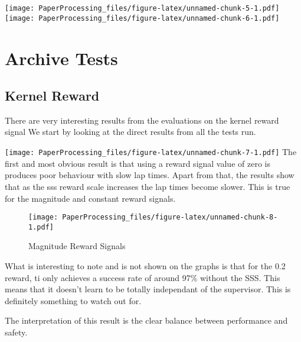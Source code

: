 \documentclass[
]{article}
\begin{document}
\texttt{[image: PaperProcessing\_files/figure-latex/unnamed-chunk-5-1.pdf]}
\texttt{[image: PaperProcessing\_files/figure-latex/unnamed-chunk-6-1.pdf]}

\hypertarget{archive-tests}{%
\section{Archive Tests}\label{archive-tests}}

\hypertarget{kernel-reward-1}{%
\subsection{Kernel Reward}\label{kernel-reward-1}}

There are very interesting results from the evaluations on the kernel
reward signal We start by looking at the direct results from all the
tests run.

\texttt{[image: PaperProcessing\_files/figure-latex/unnamed-chunk-7-1.pdf]}
The first and most obvious result is that using a reward signal value of
zero is produces poor behaviour with slow lap times. Apart from that,
the results show that as the sss reward scale increases the lap times
become slower. This is true for the magnitude and constant reward
signals.

\begin{figure}
\centering
\texttt{[image: PaperProcessing\_files/figure-latex/unnamed-chunk-8-1.pdf]}
\caption{Magnitude Reward Signals}
\end{figure}

What is interesting to note and is not shown on the graphs is that for
the 0.2 reward, ti only achieves a success rate of around 97\% without
the SSS. This means that it doesn't learn to be totally independant of
the supervisor. This is definitely something to watch out for.

The interpretation of this result is the clear balance between
performance and safety.
\end{document}
